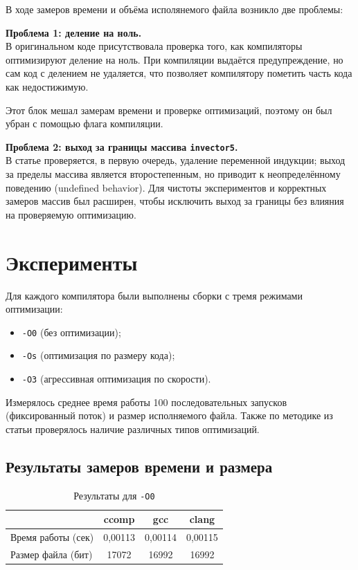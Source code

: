 \documentclass[a4paper]{article}
\begin{document}
\medskip
\noindent
В ходе замеров времени и объёма исполянемого файла возникло две проблемы:

\medskip
\noindent
\textbf{Проблема 1: деление на ноль.}\\
В оригинальном коде присутствовала проверка того, как компиляторы оптимизируют деление на ноль. При компиляции выдаётся предупреждение, но сам код с делением не удаляется, что позволяет компилятору пометить часть кода как недостижимую.

\noindent
Этот блок мешал замерам времени и проверке оптимизаций, поэтому он был убран с помощью флага компиляции.

\bigskip
\noindent
\textbf{Проблема 2: выход за границы массива \texttt{invector5}.}\\
В статье проверяется, в первую очередь, удаление переменной индукции; выход за пределы массива является второстепенным, но приводит к неопределённому поведению (undefined behavior). Для чистоты экспериментов и корректных замеров массив был расширен, чтобы исключить выход за границы без влияния на проверяемую оптимизацию.

\bigskip
\bigskip
\bigskip
\bigskip

\section{Эксперименты}
\noindent
Для каждого компилятора были выполнены сборки с тремя режимами оптимизации:
\begin{itemize}
    \item \texttt{-O0} (без оптимизации);
    \item \texttt{-Os} (оптимизация по размеру кода);
    \item \texttt{-O3} (агрессивная оптимизация по скорости).
\end{itemize}
\smallskip
Измерялось среднее время работы 100 последовательных запусков (фиксированный поток) и размер исполняемого файла. Также по методике из статьи проверялось наличие различных типов оптимизаций.

\bigskip
\subsection{Результаты замеров времени и размера}
\renewcommand{\arraystretch}{1.2}
\begin{table}[H]
\centering
\caption{Результаты для \texttt{-O0}}
\begin{tabular}{lccc}
\toprule
& \textbf{ccomp} & \textbf{gcc} & \textbf{clang} \\
\midrule
Время работы (сек) & 0,00113 & 0,00114 & 0,00115 \\
Размер файла (бит) & 17072   & 16992   & 16992 \\
\bottomrule
\end{tabular}
\end{table}
\end{document}
